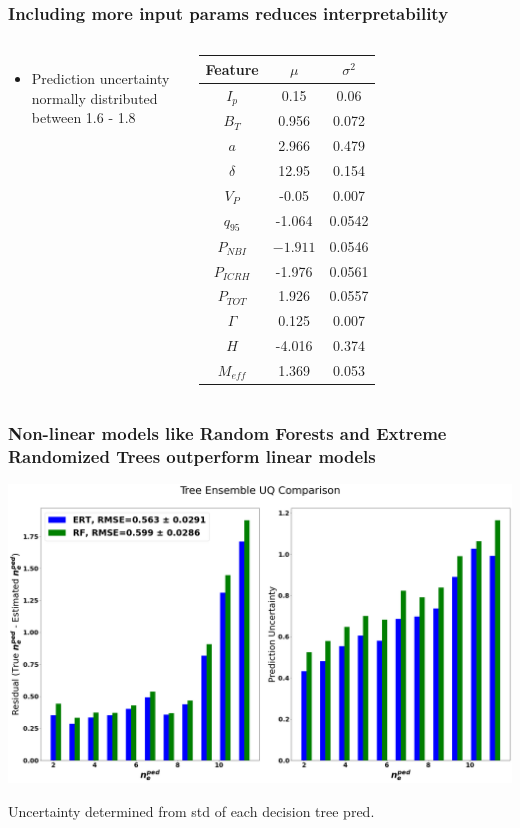 \documentclass{beamer}
\begin{document}
\begin{frame}
\frametitle{Including more input params reduces interpretability}
\begin{columns}
\begin{itemize}
	\item Prediction uncertainty \\ normally distributed between 1.6 - 1.8
\end{itemize}
\begin{tabular}{ | c | c | c |}
			\hline
			Feature & $\mu$ & $\sigma^2$ \\
			\hline
			$I_p$ & 0.15 & 0.06 \\
			$B_T$ & 0.956 & 0.072 \\
			$a$ & 2.966 & 0.479 \\
			$\delta$ & 12.95 & 0.154 \\
			$V_P$ & -0.05 & 0.007 \\
			$q_{95}$ & -1.064 & 0.0542 \\
			$P_{NBI}$ & $-1.911$ & 0.0546 \\
			$P_{ICRH}$ & -1.976 & 0.0561 \\
			$P_{TOT}$ & 1.926 & 0.0557 \\
			$\Gamma$ & 0.125 & 0.007 \\
			$H$ & -4.016 & 0.374  \\
			$M_{eff}$ & 1.369 & 0.053 \\
			\hline
\end{tabular}
\end{columns}
\end{frame}

\begin{frame}
\frametitle{Non-linear models like Random Forests and Extreme Randomized Trees outperform linear models }
\begin{center}
\includegraphics[scale=0.15]{./src/Tree_UQ}
\end{center}

Uncertainty determined from std of each decision tree pred.
\end{frame}
\end{document}
